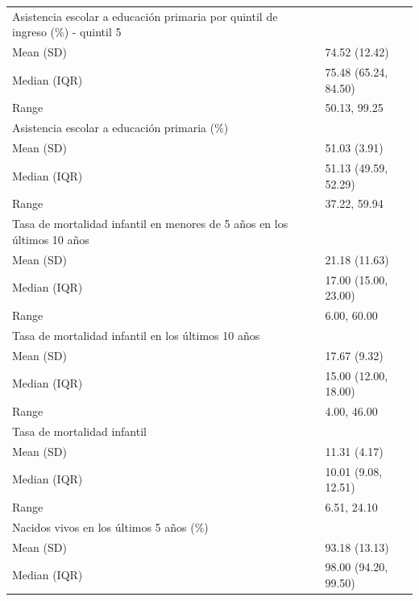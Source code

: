 \begin{table}
\begin{tabular}{ll}
Asistencia escolar a educación primaria por quintil de ingreso (\%) - quintil 5 & \\
\hspace{1em}Mean (SD) & 74.52 (12.42)\\
\hspace{1em}Median (IQR) & 75.48 (65.24, 84.50)\\
\hspace{1em}Range & 50.13, 99.25\\
Asistencia escolar a educación primaria (\%) & \\
\addlinespace
\hspace{1em}Mean (SD) & 51.03 (3.91)\\
\hspace{1em}Median (IQR) & 51.13 (49.59, 52.29)\\
\hspace{1em}Range & 37.22, 59.94\\
Tasa de mortalidad infantil en menores de 5 años en los últimos 10 años & \\
\hspace{1em}Mean (SD) & 21.18 (11.63)\\
\addlinespace
\hspace{1em}Median (IQR) & 17.00 (15.00, 23.00)\\
\hspace{1em}Range & 6.00, 60.00\\
Tasa de mortalidad infantil en los últimos 10 años & \\
\hspace{1em}Mean (SD) & 17.67 (9.32)\\
\hspace{1em}Median (IQR) & 15.00 (12.00, 18.00)\\
\addlinespace
\hspace{1em}Range & 4.00, 46.00\\
Tasa de mortalidad infantil & \\
\hspace{1em}Mean (SD) & 11.31 (4.17)\\
\hspace{1em}Median (IQR) & 10.01 (9.08, 12.51)\\
\hspace{1em}Range & 6.51, 24.10\\
\addlinespace
Nacidos vivos en los últimos 5 años (\%) & \\
\hspace{1em}Mean (SD) & 93.18 (13.13)\\
\hspace{1em}Median (IQR) & 98.00 (94.20, 99.50)\\

\end{tabular}
\end{table}
